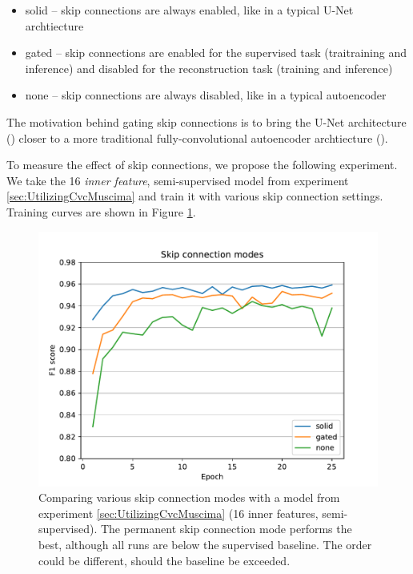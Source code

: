 \begin{itemize}
    \item solid -- skip connections are always enabled, like in a typical U-Net archtiecture
    \item gated -- skip connections are enabled for the supervised task (traitraining and inference) and disabled for the reconstruction task (training and inference)
    \item none -- skip connections are always disabled, like in a typical autoencoder
\end{itemize}

The motivation behind gating skip connections is to bring the U-Net architecture (\cite{UNet}) closer to a more traditional fully-convolutional autoencoder archtiecture (\cite{AutoencodersOverview}).

To measure the effect of skip connections, we propose the following experiment. We take the 16 \emph{inner feature}, semi-supervised model from experiment \ref{sec:UtilizingCvcMuscima} and train it with various skip connection settings. Training curves are shown in Figure \ref{fig:SkipConnections}.

\begin{figure}[ht]
    \centering
    \includegraphics[width=140mm]{../../figures/05-skip-connections/skip.pdf}
    \caption{Comparing various skip connection modes with a model from experiment \ref{sec:UtilizingCvcMuscima} (16 inner features, semi-supervised). The permanent skip connection mode performs the best, although all runs are below the supervised baseline. The order could be different, should the baseline be exceeded.}
    \label{fig:SkipConnections}
\end{figure}

